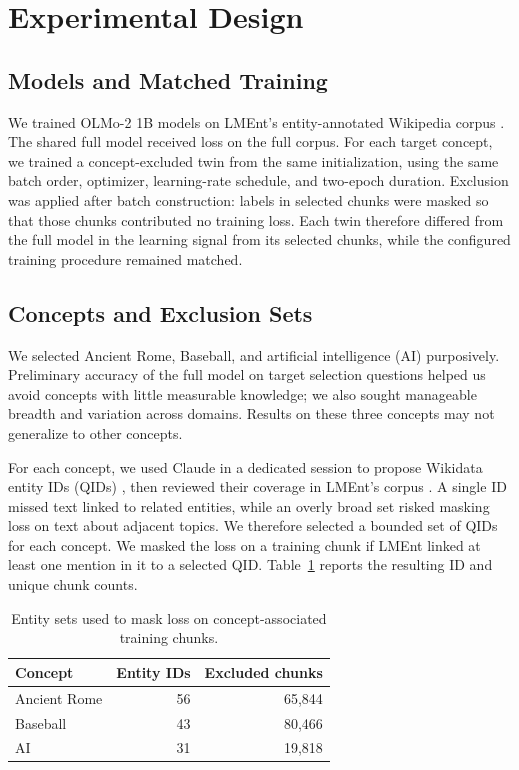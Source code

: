 \section{Experimental Design}
\label{sec:experimental-design}

\subsection{Models and Matched Training}

We trained OLMo-2 1B models on LMEnt's entity-annotated Wikipedia corpus
\citep{walsh2025olmo2,gottesman2025lment}. The shared full model received
loss on the full corpus. For each target concept, we trained a
concept-excluded twin from the same initialization, using the same batch
order, optimizer, learning-rate schedule, and two-epoch duration. Exclusion
was applied after batch construction: labels in selected chunks were masked
so that those chunks contributed no training loss. Each twin therefore
differed from the full model in the learning signal from its selected
chunks, while the configured training procedure remained matched.

\subsection{Concepts and Exclusion Sets}

We selected Ancient Rome, Baseball, and artificial intelligence (AI)
purposively. Preliminary accuracy of the full model on target selection
questions helped us avoid concepts with little measurable knowledge; we also
sought manageable breadth and variation across domains. Results on these
three concepts may not generalize to other concepts.

For each concept, we used Claude in a dedicated session to propose
Wikidata entity IDs (QIDs) \citep{vrandecic2014wikidata}, then reviewed their
coverage in LMEnt's corpus \citep{gottesman2025lment}. A single ID missed text
linked to related entities, while an overly broad set risked masking loss on
text about adjacent topics. We therefore selected a bounded set of QIDs for
each concept. We masked the loss on a training chunk if LMEnt linked at
least one
mention in it to a selected QID.
Table~\ref{tab:exclusion-sets} reports the resulting ID and unique chunk counts.

\begin{table}[b]
  \centering
  \small
  \begin{tabular}{lrr}
    \toprule
    Concept & Entity IDs & Excluded chunks \\
    \midrule
    Ancient Rome & 56 & 65,844 \\
    Baseball & 43 & 80,466 \\
    AI & 31 & 19,818 \\
    \bottomrule
  \end{tabular}
  \caption{Entity sets used to mask loss on concept-associated training chunks.}
  \label{tab:exclusion-sets}
\end{table}

